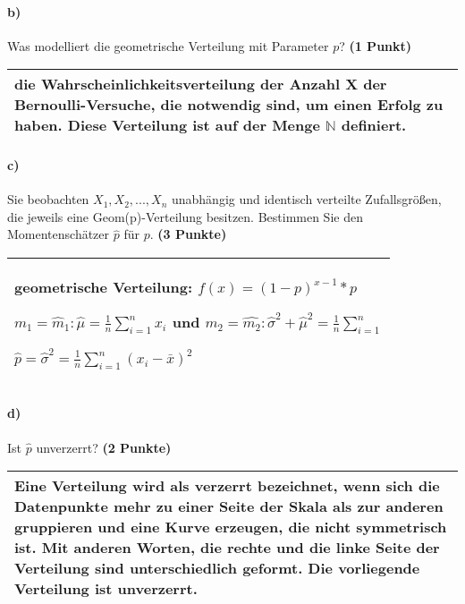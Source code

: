 \documentclass[10pt, a4paper]{article}
\begin{document}
\paragraph{b)} Was modelliert die geometrische Verteilung mit Parameter $p$? \textbf{(1 Punkt)}\\
\begin{tabular}{| p{17cm} |}
    \hline
    die Wahrscheinlichkeitsverteilung der Anzahl X der Bernoulli-Versuche, die notwendig sind, um einen Erfolg zu haben. Diese Verteilung ist auf der Menge $\mathbb{N}$ definiert.
    \\\hline
\end{tabular}

\paragraph{c)} Sie beobachten $X_1,X_2,...,X_n$ unabhängig und identisch verteilte Zufallsgrößen, die jeweils eine Geom(p)-Verteilung besitzen. Bestimmen Sie den Momentenschätzer $\hat{p}$ für $p$. \textbf{(3 Punkte)}\\
\begin{tabular}{| p{17cm} |}
    \hline
    geometrische Verteilung: $f(x)=(1-p)^{x-1}*p$

    $m_1=\hat{m}_1: \hat{\mu}=\frac{1}{n} \sum_{i=1}^{n} x_i$ und $m_2=\hat{m_2}:\hat{\sigma}^2+\hat{\mu}^2 =\frac{1}{n} \sum_{i=1}^{n}$

    $\hat{p} = \hat{\sigma}^2=\frac{1}{n}\sum_{i=1}^n (x_i-\bar{x})^2$

    \\\hline
\end{tabular}

\paragraph{d)} Ist $\hat{p}$ unverzerrt? \textbf{(2 Punkte)}\\
\begin{tabular}{| p{17cm} |}
    \hline
    Eine Verteilung wird als verzerrt bezeichnet, wenn sich die Datenpunkte mehr zu einer Seite der Skala als zur anderen gruppieren und eine Kurve erzeugen, die nicht symmetrisch ist. Mit anderen Worten, die rechte und die linke Seite der Verteilung sind unterschiedlich geformt. Die vorliegende Verteilung ist unverzerrt.
    \\\hline
\end{tabular}
\end{document}
